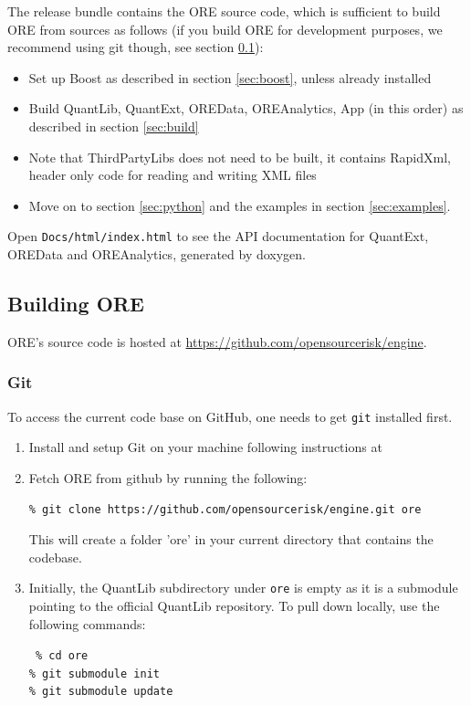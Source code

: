 \documentclass[12pt, a4paper]{article}
\begin{document}
\medskip
The release bundle contains the ORE source code, which is sufficient to build ORE from sources as follows (if you build ORE for development purposes, we recommend using git though, see section \ref{sec:build_ore}):
\begin{itemize}
\item Set up Boost as described in section \ref{sec:boost}, unless already installed
\item Build QuantLib, QuantExt, OREData, OREAnalytics, App (in this order) as described in section \ref{sec:build}
\item Note that ThirdPartyLibs does not need to be built, it contains RapidXml, header only code for reading and
  writing XML files
\item Move on to section \ref{sec:python} and the examples in section \ref{sec:examples}.
\end{itemize}

Open {\tt Docs/html/index.html} to see the API documentation for QuantExt, OREData and OREAnalytics, generated by
doxygen.

\subsection{Building ORE}\label{sec:build_ore}

ORE's source code is hosted at \url{https://github.com/opensourcerisk/engine}.

\subsubsection{Git}

To access the current code base on GitHub, one needs to get {\tt git} installed first.
   
\begin{enumerate}
\item Install and setup Git on your machine following instructions at \cite{git-download}

\item Fetch ORE from github by running the following: 

{\tt\% git clone https://github.com/opensourcerisk/engine.git ore}      

This will create a folder 'ore' in your current directory that contains the codebase.

\item Initially, the QuantLib subdirectory under {\tt ore} is empty as it is a submodule pointing to the official
  QuantLib repository. To pull down locally, use the following commands:

{\tt
\% cd ore \\
\% git submodule init \\
\% git submodule update
}

\end{enumerate}
\end{document}
